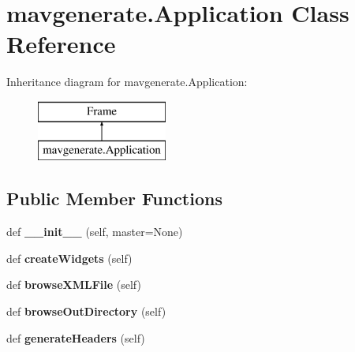 \hypertarget{classmavgenerate_1_1Application}{}\section{mavgenerate.\+Application Class Reference}
\label{classmavgenerate_1_1Application}
Inheritance diagram for mavgenerate.\+Application\+:\begin{figure}[H]
\begin{center}
\leavevmode
\includegraphics[height=2.000000cm]{classmavgenerate_1_1Application}
\end{center}
\end{figure}
\subsection*{Public Member Functions}
\begin{DoxyCompactItemize}
\item 
\mbox{\label{classmavgenerate_1_1Application_a102f9945e9b6e87946ac389c83c54bc1}} 
def {\bfseries \+\_\+\+\_\+init\+\_\+\+\_\+} (self, master=None)
\item 
\mbox{\label{classmavgenerate_1_1Application_a87a3527491a19cc5815364afe2ff96e5}} 
def {\bfseries create\+Widgets} (self)
\item 
\mbox{\label{classmavgenerate_1_1Application_a709e2711f42d143e1fe4184437c99fa7}} 
def {\bfseries browse\+X\+M\+L\+File} (self)
\item 
\mbox{\label{classmavgenerate_1_1Application_a51a50e0ae663d975e2106600310825fb}} 
def {\bfseries browse\+Out\+Directory} (self)
\item 
\mbox{\label{classmavgenerate_1_1Application_a1643cb62a9d7374557f6c04bace5092a}} 
def {\bfseries generate\+Headers} (self)
\end{DoxyCompactItemize}
